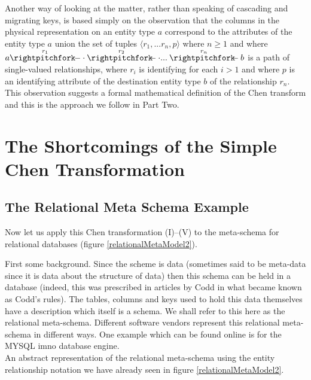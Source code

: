 \documentclass[10pt,a4paper]{article}
\begin{document}
\noindent Another way of looking at the matter, rather than speaking of cascading and migrating keys, is based simply on the observation that the columns in the physical representation on an entity type $a$ correspond to the attributes of the entity type $a$ union the set of tuples $\langle r_1,...r_n, p \rangle$ where $n \geq 1$ and where
$\overset{r_1}{a \rightpitchfork \hspace{-0.35em} -  \cdot} \overset{r_2}{\rightpitchfork \hspace{-0.35em} -} \cdot ... \overset{r_n}{\rightpitchfork \hspace{-0.35em} -} b$ is a path of single-valued relationships, where 
$r_i$ is identifying for each $i > 1$ and where $p$ is an identifying attribute of the destination entity type $b$ of the
relationship $r_n$. This observation suggests a formal mathematical definition of the Chen transform and this is the approach we follow in Part Two. \\



\section{The Shortcomings of the Simple Chen Transformation}
\subsection{The Relational Meta Schema Example}
\noindent Now let us apply this Chen transformation (I)--(V) to the meta-schema for relational databases
(figure \ref{relationalMetaModel2}).


\noindent First some background. Since the scheme is data (sometimes said to be meta-data since it is data about the structure of data)
then this schema can be held in a database (indeed, this was prescribed in articles by Codd in what became known as Codd's rules). The tables, columns and keys used to hold this data themselves have a description which itself is a schema. We shall refer to this here as the relational meta-schema. 
Different software vendors represent this relational meta-schema in different ways. One example which can be found 
online \cite{MySQLRefMan} is for the MYSQL imno database engine.\\ 

\noindent An abstract representation of the relational meta-schema using the entity relationship notation we have already seen in figure \ref{relationalMetaModel2}. \\ 
\end{document}
